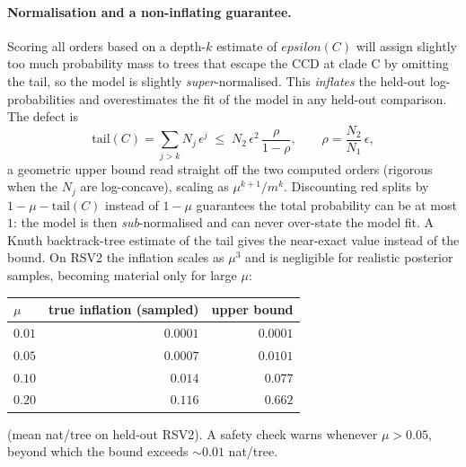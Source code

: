 \documentclass{article}
\begin{document}
\paragraph{Normalisation and a non-inflating guarantee.}
Scoring all orders based on a depth-$k$ estimate of $epsilon(C)$ will assign slightly too much probability mass to trees that escape the CCD at clade C by omitting the tail, so the model is slightly \emph{super}-normalised. This 
\emph{inflates} the held-out log-probabilities and overestimates the fit of the model in any held-out
comparison. The defect is
\begin{equation}
  \mathrm{tail}(C)=\sum_{j>k}N_j\,\epsilon^j
  \;\le\; N_2\,\epsilon^2\,\frac{\rho}{1-\rho},
  \qquad \rho=\frac{N_2}{N_1}\,\epsilon,
  \label{eq:tail}
\end{equation}
a geometric upper bound read straight off the two computed orders (rigorous when
the $N_j$ are log-concave), scaling as $\mu^{k+1}/m^{k}$. Discounting red splits by
$1-\mu-\mathrm{tail}(C)$ instead of $1-\mu$ guarantees the total probability can be at most
$1$: the model is then \emph{sub}-normalised and can never over-state the model fit. A
Knuth backtrack-tree estimate of the tail gives the near-exact value instead of
the bound. On RSV2 the inflation scales as $\mu^3$ and is negligible for realistic posterior samples, becoming material only for large $\mu$:
\begin{center}
\renewcommand{\arraystretch}{1.1}
\begin{tabular}{lrr}
\hline
$\mu$ & true inflation (sampled) & upper bound \\
\hline
$0.01$ & $0.0001$ & $0.0001$ \\
$0.05$ & $0.0007$ & $0.0101$ \\
$0.10$ & $0.014$ & $0.077$ \\
$0.20$ & $0.116$ & $0.662$ \\
\hline
\end{tabular}
\end{center}
(mean nat/tree on held-out RSV2). A safety check warns whenever $\mu>0.05$, beyond
which the bound exceeds $\sim 0.01$ nat/tree.
\end{document}
